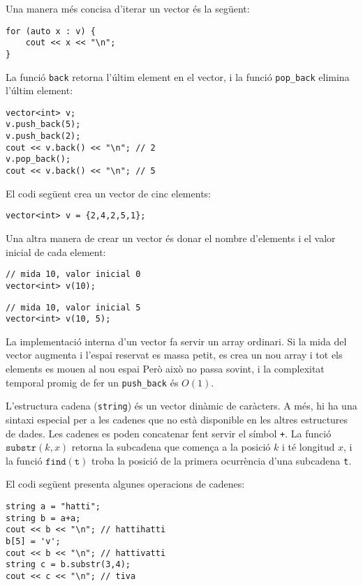 Una manera més concisa d'iterar un vector és la següent:

\begin{lstlisting}
for (auto x : v) {
    cout << x << "\n";
}
\end{lstlisting}

La funció \texttt{back} retorna l'últim element
en el vector, i la funció \texttt{pop\_back} elimina l'últim element:

\begin{lstlisting}
vector<int> v;
v.push_back(5);
v.push_back(2);
cout << v.back() << "\n"; // 2
v.pop_back();
cout << v.back() << "\n"; // 5
\end{lstlisting}

El codi següent crea un vector de cinc elements:

\begin{lstlisting}
vector<int> v = {2,4,2,5,1};
\end{lstlisting}

Una altra manera de crear un vector és donar el nombre
d'elements i el valor inicial de cada element:

\begin{lstlisting}
// mida 10, valor inicial 0
vector<int> v(10);
\end{lstlisting}
\begin{lstlisting}
// mida 10, valor inicial 5
vector<int> v(10, 5);
\end{lstlisting}

La implementació interna d'un vector
fa servir un array ordinari.
Si la mida del vector augmenta i
l'espai reservat es massa petit,
es crea un nou array i tot
els elements es mouen al nou espai
Però això no passa sovint, i la
complexitat temporal promig de fer un
\texttt{push\_back} és $O(1)$.


L'estructura cadena (\texttt{string})
és un vector dinàmic de caràcters.
A més, hi ha una sintaxi especial per a les cadenes
que no està disponible en les altres estructures de dades.
Les cadenes es poden concatenar fent servir el símbol \texttt{+}.
La funció $\texttt{substr}(k,x)$ retorna la subcadena
que comença a la posició $k$ i té longitud $x$,
i la funció $\texttt{find}(\texttt{t})$ troba la posició
de la primera ocurrència d'una subcadena \texttt{t}.

El codi següent presenta algunes operacions de cadenes:

\begin{lstlisting}
string a = "hatti";
string b = a+a;
cout << b << "\n"; // hattihatti
b[5] = 'v';
cout << b << "\n"; // hattivatti
string c = b.substr(3,4);
cout << c << "\n"; // tiva
\end{lstlisting}

